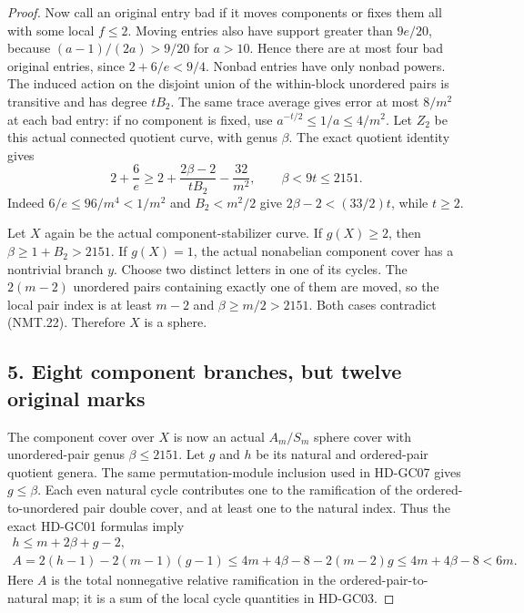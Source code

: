 \begin{proof}
Now call an original entry bad if it moves components or
fixes them all with some local $f\le2$.
Moving entries also have support greater than $9e/20$,
because $(a-1)/(2a)>9/20$ for $a>10$.
Hence there are at most four bad original entries, since
$2+6/e<9/4$.  Nonbad entries have only nonbad powers.
The induced action on the disjoint union of the within-block
unordered pairs is transitive and has degree $tB_2$.
The same trace average gives error at most $8/m^2$ at each
bad entry: if no component is fixed, use
$a^{-t/2}\le1/a\le4/m^2$.
Let $Z_2$ be this actual connected quotient curve, with genus
$\beta$.  The exact quotient identity gives
\[
 2+\frac6e\ge
 2+\frac{2\beta-2}{tB_2}-\frac{32}{m^2},
 \qquad
                  \beta<9t\le2151.
 \tag{NMT.22}
\]
Indeed $6/e\le96/m^4<1/m^2$ and $B_2<m^2/2$ give
$2\beta-2<(33/2)t$, while $t\ge2$.

Let $X$ again be the actual component-stabilizer curve.
If $g(X)\ge2$, then $\beta\ge1+B_2>2151$.
If $g(X)=1$, the actual nonabelian component cover has a
nontrivial branch $y$.  Choose two distinct letters in
one of its cycles.  The $2(m-2)$ unordered pairs containing
exactly one of them are moved, so the local pair index is
at least $m-2$ and $\beta\ge m/2>2151$.
Both cases contradict (NMT.22).  Therefore $X$ is a sphere.

\subsection*{5. Eight component branches, but twelve original marks}

The component cover over $X$ is now an actual $A_m/S_m$
sphere cover with unordered-pair genus $\beta\le2151$.
Let $g$ and $h$ be its natural and ordered-pair quotient
genera.  The same permutation-module inclusion used in
HD-GC07 gives $g\le\beta$.
Each even natural cycle contributes one to the ramification
of the ordered-to-unordered pair double cover, and at least
one to the natural index.  Thus the exact HD-GC01 formulas
imply
\[
 \begin{gathered}
 h\le m+2\beta+g-2,\\
 A=2(h-1)-2(m-1)(g-1)
       \le4m+4\beta-8-2(m-2)g
       \le4m+4\beta-8<6m .
 \end{gathered}
 \tag{NMT.23}
\]
Here $A$ is the total nonnegative relative ramification in
the ordered-pair-to-natural map; it is a sum of the local
cycle quantities in HD-GC03.


\end{proof}
